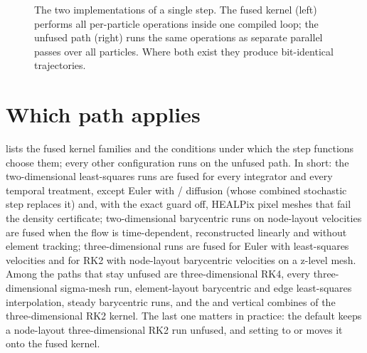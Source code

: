 \begin{figure}[t]
\centering
{}
\caption{The two implementations of a single step. The fused kernel (left) performs all
per-particle operations inside one compiled loop; the unfused path (right) runs the same operations
as separate parallel passes over all particles. Where both exist they produce bit-identical
trajectories.}
\label{fig:fused}
\end{figure}

\section{Which path applies}\label{sec:fused-which}

 lists the fused kernel families and the conditions under which the step
functions choose them; every other configuration runs on the unfused path. In short: the
two-dimensional least-squares runs are fused for every integrator and every temporal treatment, except
Euler with / diffusion (whose combined stochastic step replaces it) and, with the exact
guard off, HEALPix pixel meshes that fail the density certificate;
two-dimensional barycentric runs on node-layout velocities are fused when the flow is time-dependent,
reconstructed linearly and without element tracking;
three-dimensional runs are fused for Euler with least-squares velocities and for RK2 with node-layout
barycentric velocities on a z-level mesh. Among the paths that stay unfused are three-dimensional
RK4, every three-dimensional sigma-mesh run, element-layout barycentric and edge least-squares
interpolation, steady barycentric runs, and the  and  vertical combines of the
three-dimensional RK2 kernel. The last one matters in practice: the default
 keeps a node-layout three-dimensional RK2 run unfused, and setting
 to  or  moves it onto the fused kernel.

